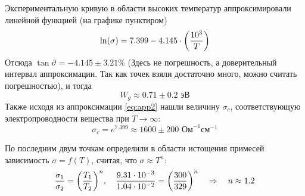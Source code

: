 \documentclass[a4paper,14pt]{extarticle}
\begin{document}
Экспериментальную кривую в области высоких температур аппроксимировали линейной функцией (на графике пунктиром)
\begin{equation}
	\label{eq:app2}
	\ln(\sigma)=7.399-4.145\cdot\qty(\frac{10^3}{T})
\end{equation}
Отсюда $\tan\vartheta=-4.145\pm3.21\%$ (Здесь не погрешность, а доверительный интервал аппроксимации. Так как точек взяли достаточно много, можно считать погрешностью), и тогда
\begin{equation}
	W_g \approx 0.71\pm0.2 \text{ эВ}
\end{equation}
Также исходя из аппроксимации \eqref{eq:app2} нашли величину $\sigma_c$, соответствующую электропроводности вещества при $T \to \infty$:
\begin{equation}
	\sigma_c=e^{7.399}\approx 1600\pm 200 \text{ Ом}^{-1}\text{см}^{-1}
\end{equation}

По последним двум точкам определили в области истощения примесей зависимость $\sigma = f(T)$, считая, что $\sigma \approx T^n$:
\begin{equation}
	\frac{\sigma_1}{\sigma_2}=\qty(\frac{T_1}{T_2})^n, \quad
	\frac{9.31\cdot10^{-3}}{1.04\cdot10^{-2}}=\qty(\frac{300}{329})^n	
	\quad \Rightarrow \quad n\approx 1.2
\end{equation}
\end{document}
